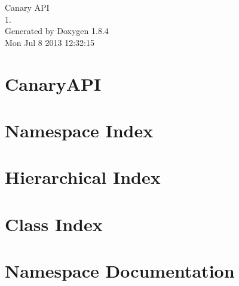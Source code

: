 \documentclass[twoside]{book}
\newcommand{\clearemptydoublepage}{%
  \newpage{\pagestyle{empty}\cleardoublepage}%
}
\begin{document}
\hypersetup{pageanchor=false}
\begin{titlepage}
\vspace*{7cm}
\begin{center}%
{\Large Canary A\-P\-I \\[1ex]\large 1. }\\
\vspace*{1cm}
{\large Generated by Doxygen 1.8.4}\\
\vspace*{0.5cm}
{\small Mon Jul 8 2013 12:32:15}\\
\end{center}
\end{titlepage}
\clearemptydoublepage
\tableofcontents
\clearemptydoublepage
{}
\hypersetup{pageanchor=true}

\chapter{Canary\-A\-P\-I}
\label{md_README}
\hypertarget{md_README}{}

\chapter{Namespace Index}

\chapter{Hierarchical Index}

\chapter{Class Index}

\chapter{Namespace Documentation}















\end{document}

